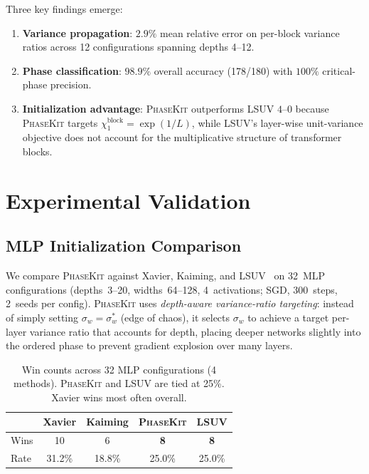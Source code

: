 \documentclass[10pt]{article}
\newcommand{\ToolName}{\textsc{PhaseKit}}
\begin{document}
Three key findings emerge:
\begin{enumerate}[nosep]
    \item \textbf{Variance propagation}: $2.9\%$ mean relative error on per-block variance ratios across 12 configurations spanning depths 4--12.
    \item \textbf{Phase classification}: $98.9\%$ overall accuracy (178/180) with $100\%$ critical-phase precision.
    \item \textbf{Initialization advantage}: \ToolName{} outperforms LSUV $4$--$0$ because \ToolName{} targets $\chi_1^{\text{block}} = \exp(1/L)$, while LSUV's layer-wise unit-variance objective does not account for the multiplicative structure of transformer blocks.
\end{enumerate}

\section{Experimental Validation}
\label{sec:experiments}

\subsection{MLP Initialization Comparison}
\label{sec:baseline-comparison}

We compare \ToolName{} against Xavier, Kaiming, and LSUV~\cite{mishkin2016all} on 32~MLP configurations (depths~3--20, widths~64--128, 4~activations; SGD, 300~steps, 2~seeds per config).
\ToolName{} uses \emph{depth-aware variance-ratio targeting}: instead of simply setting $\sigma_w = \sigma_w^*$ (edge of chaos), it selects $\sigma_w$ to achieve a target per-layer variance ratio that accounts for depth, placing deeper networks slightly into the ordered phase to prevent gradient explosion over many layers.

\begin{table}[t]
\centering
\caption{Win counts across 32 MLP configurations (4 methods). \ToolName{} and LSUV are tied at 25\%. Xavier wins most often overall.}
\label{tab:baseline-wins}
\small
\begin{tabular}{@{}lcccc@{}}
\toprule
& \textbf{Xavier} & \textbf{Kaiming} & \textbf{\ToolName{}} & \textbf{LSUV} \\
\midrule
Wins & 10 & 6 & \textbf{8} & \textbf{8} \\
Rate & 31.2\% & 18.8\% & 25.0\% & 25.0\% \\
\bottomrule
\end{tabular}
\end{table}
\end{document}

